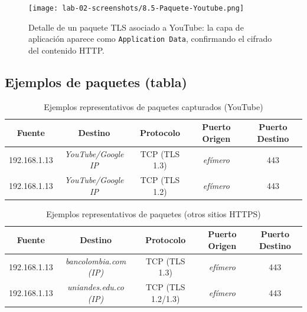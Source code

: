 \documentclass[10pt]{article}
\begin{document}
\begin{figure}[H]
    \centering
    \texttt{[image: lab-02-screenshots/8.5-Paquete-Youtube.png]}
    \caption{Detalle de un paquete TLS asociado a YouTube: la capa de aplicación aparece como \texttt{Application Data}, confirmando el cifrado del contenido HTTP.}
\end{figure}

\subsection*{Ejemplos de paquetes (tabla)}
\begin{table}[H]
\centering
\caption{Ejemplos representativos de paquetes capturados (YouTube)}
\begin{tabular}{|c|c|c|c|c|}
\hline
\textbf{Fuente} & \textbf{Destino} & \textbf{Protocolo} & \textbf{Puerto Origen} & \textbf{Puerto Destino} \\
\hline
192.168.1.13 & \textit{YouTube/Google IP} & TCP (TLS 1.3) & \textit{efímero} & 443 \\
192.168.1.13 & \textit{YouTube/Google IP} & TCP (TLS 1.2) & \textit{efímero} & 443 \\
\hline
\end{tabular}
\end{table}

\begin{table}[H]
\centering
\caption{Ejemplos representativos de paquetes (otros sitios HTTPS)}
\begin{tabular}{|c|c|c|c|c|}
\hline
\textbf{Fuente} & \textbf{Destino} & \textbf{Protocolo} & \textbf{Puerto Origen} & \textbf{Puerto Destino} \\
\hline
192.168.1.13 & \textit{bancolombia.com (IP)} & TCP (TLS 1.3) & \textit{efímero} & 443 \\
192.168.1.13 & \textit{uniandes.edu.co (IP)} & TCP (TLS 1.2/1.3) & \textit{efímero} & 443 \\
\hline
\end{tabular}
\end{table}

\end{document}

